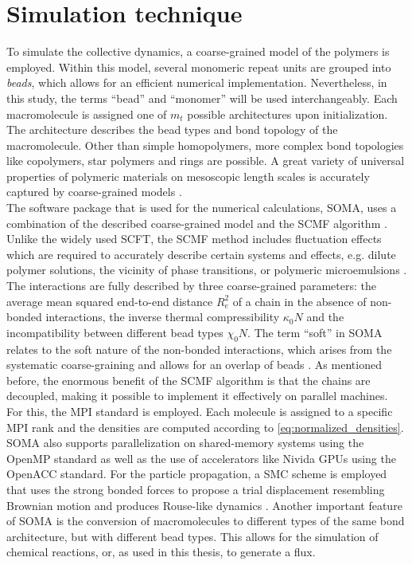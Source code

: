 \documentclass[bachelor,       %
               oneside,        %
               BCOR10mm,       %
               ngerman, english %
               ]{GAUBM}
\begin{document}
\chapter{Simulation technique}


To simulate the collective dynamics, a coarse-grained model of the polymers is employed. Within this model, several monomeric repeat units are grouped into \textit{beads}, which allows for an efficient numerical implementation. Nevertheless, in this study, the terms \enquote{bead} and \enquote{monomer} will be used interchangeably. Each macromolecule is assigned one of $m_t$ possible architectures upon initialization. The architecture describes the bead types and bond topology of the macromolecule. Other than simple homopolymers, more complex bond topologies like copolymers, star polymers and rings are possible. A great variety of universal properties of polymeric materials on mesoscopic length scales is accurately captured by coarse-grained models \cite{Baschnagel03}.\\
The software package that is used for the numerical calculations, \ac{SOMA}, uses a combination of the described coarse-grained model and the \ac{SCMF} algorithm \cite{Daoulas06}. Unlike the widely used \ac{SCFT}, the \ac{SCMF} method includes fluctuation effects which are required to accurately describe certain systems and effects, e.g. dilute polymer solutions, the vicinity of phase transitions, or polymeric microemulsions \cite{Bates97, Mueller02, Schmid03}. The interactions are fully described by three coarse-grained parameters: the average mean squared end-to-end distance $R_{e}^2$ of a chain in the absence of non-bonded interactions, the inverse thermal compressibility $\kappa_0 N$ and the incompatibility between different bead types $\chi_0 N$. The term \enquote{soft} in \ac{SOMA} relates to the soft nature of the non-bonded interactions, which arises from the systematic coarse-graining and allows for an overlap of beads \cite{Mueller11soft}. As mentioned before, the enormous benefit of the \ac{SCMF} algorithm is that the chains are decoupled, making it possible to implement it effectively on parallel machines. For this, the \ac{MPI} standard is employed. Each molecule is assigned to a specific \ac{MPI} rank and the densities are computed according to \autoref{eq:normalized_densities}. \ac{SOMA} also supports parallelization on shared-memory systems using the OpenMP standard as well as the use of accelerators like Nivida \acp{GPU} \cite{Schneider_soma} using the OpenACC standard. For the particle propagation, a \ac{SMC} scheme is employed that uses the strong bonded forces to propose a trial displacement resembling Brownian motion and produces Rouse-like dynamics \cite{Pangali78,Rossky78}. Another important feature of \ac{SOMA} is the conversion of macromolecules to different types of the same bond architecture, but with different bead types. This allows for the simulation of chemical reactions, or, as used in this thesis, to generate a flux. \\
\end{document}
